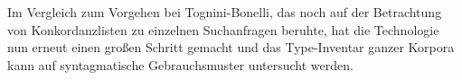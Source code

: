 Im Vergleich zum Vorgehen bei Tognini-Bonelli, das noch auf der Betrachtung von Konkordanzlisten zu einzelnen Suchanfragen beruhte, hat die Technologie nun erneut einen großen Schritt gemacht und das Type-Inventar ganzer Korpora kann auf syntagmatische Gebrauchsmuster untersucht werden.

\label{wie-funktioniert-die-berechnung-von-word-embeddings}

